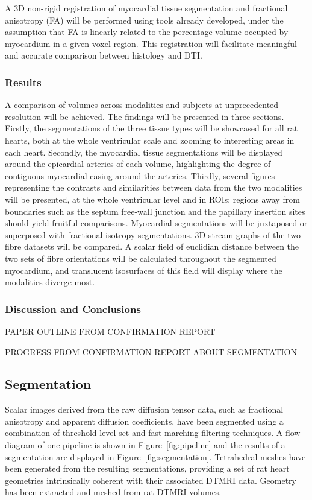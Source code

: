     A 3D non-rigid registration of myocardial tissue segmentation and fractional anisotropy (FA) will be performed using tools already developed, under the assumption that FA is linearly related to the percentage volume occupied by myocardium in a given voxel region. This registration will facilitate meaningful and accurate comparison between histology and DTI.
    
  \subsubsection{Results}
    A comparison of volumes across modalities and subjects at unprecedented resolution will be achieved. The findings will be presented in three sections. Firstly, the segmentations of the three tissue types will be showcased for all rat hearts, both at the whole ventricular scale and zooming to interesting areas in each heart. Secondly, the myocardial tissue segmentations will be displayed around the epicardial arteries of each volume, highlighting the degree of contiguous myocardial casing around the arteries. Thirdly, several figures representing the contrasts and similarities between data from the two modalities will be presented, at the whole ventricular level and in ROIs; regions away from boundaries such as the septum free-wall junction and the papillary insertion sites should yield fruitful comparisons. Myocardial segmentations will be juxtaposed or superposed with fractional isotropy segmentations. 3D stream graphs of the two fibre datasets will be compared. A scalar field of euclidian distance between the two sets of fibre orientations will be calculated throughout the segmented myocardium, and translucent isosurfaces of this field will display where the modalities diverge most.
    
  \subsubsection{Discussion and Conclusions}
PAPER OUTLINE FROM CONFIRMATION REPORT

PROGRESS FROM CONFIRMATION REPORT ABOUT SEGMENTATION

  \subsection{Segmentation}
    Scalar images derived from the raw diffusion tensor data, such as fractional anisotropy and apparent diffusion coefficients, have been segmented using a combination of threshold level set and fast marching filtering techniques. A flow diagram of one pipeline is shown in Figure~\ref{fig:pipeline} and the results of a segmentation are displayed in Figure~\ref{fig:segmentation}. Tetrahedral meshes have been generated from the resulting segmentations, providing a set of rat heart geometries intrinsically coherent with their associated DTMRI data. 
    Geometry has been extracted and meshed from rat DTMRI volumes.
    
